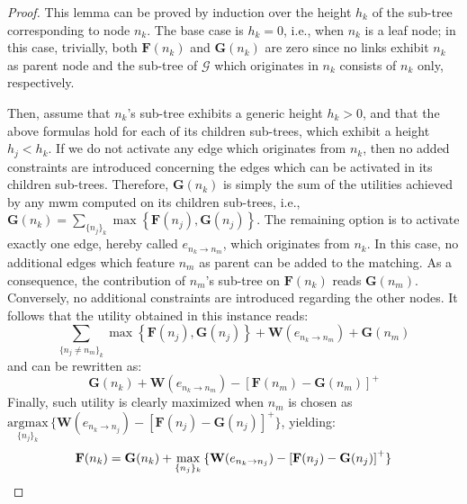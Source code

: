 \begin{proof}
This lemma can be proved by induction over the height $h_k$ of the sub-tree corresponding to node $n_k$. The base case is $h_k = 0$, i.e., when $n_k$ is a leaf node; in this case, trivially, both $\mathbf{F}(n_k)$ and $\mathbf{G}(n_k)$ are zero since no links exhibit $n_k$ as parent node and the sub-tree of $\mathcal{G}$ which originates in $n_k$ consists of $n_k$ only, respectively.

Then, assume that $n_k$'s sub-tree exhibits a generic height $h_k > 0$, and that the above formulas hold for each of its children sub-trees, which exhibit a height $h_j < h_k$. If we do not activate any edge which originates from $n_k$, then no added constraints are introduced concerning the edges which can be activated in its children sub-trees. Therefore, %
$\mathbf{G}(n_k)$ is simply the sum of the utilities achieved by any \gls{mwm} computed on its children sub-trees, i.e.,  $\mathbf{G}(n_k) = \sum\limits_{ \{ n_j \}_k} \max \left\{ \mathbf{F}(n_j), \mathbf{G}(n_j) \right\}$.
The remaining option is to activate exactly one edge, hereby called $e_{n_k \to n_m}$, which originates from $n_k$. In this case, no additional edges which feature $n_m$ as parent can be added to the matching. As a consequence, the contribution of $n_m$'s sub-tree on $\mathbf{F}(n_k)$ reads $\mathbf{G}(n_m)$. Conversely, no additional constraints are introduced regarding the other nodes. It follows that the utility obtained in this instance reads:
\[ \sum_{ \{ n_j \neq n_m\}_k } \max \left\{ \mathbf{F}(n_j), \mathbf{G}(n_j) \right\} +  \mathbf{W} ( e_{n_k \to n_m} ) + \mathbf{G}(n_m) \]
and can be rewritten as:
\[  \mathbf{G}(n_k) + \mathbf{W} ( e_{n_k \to n_m} ) - \left[ \mathbf{F}(n_m) - \mathbf{G}(n_m) \right]^+ \]
Finally, such utility is clearly maximized when $n_m$ is chosen as $ \underset{ \{ n_j \}_k }{\mathrm{argmax}} \, \{ \mathbf{W} ( e_{n_k \to n_j} ) - \left[ \mathbf{F}(n_j) - \mathbf{G}(n_j) \right]^+ \}$, yielding:
\[ \mathbf{F}(n_k) = \mathbf{G}(n_k) + \underset{\{ n_j \}_k }{\max} \, \{ \mathbf{W} ( e_{n_k \to n_j} ) - \left[ \mathbf{F}(n_j) -  \mathbf{G}(n_j) \right]^+ \} \qedhere \] 
\end{proof}

